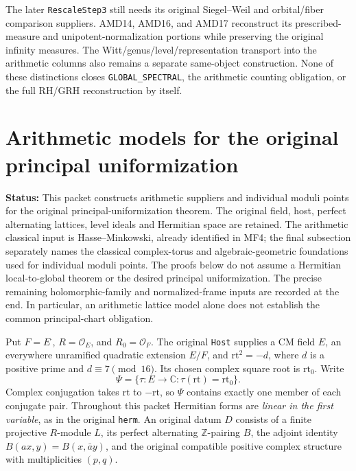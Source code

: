 \documentclass[11pt,a4paper]{article}
\numberwithin{equation}{section}
\theoremstyle{remark}\newtheorem{remark}[theorem]{Remark}
\newcommand{\status}[1]{\textbf{Status:} #1}
\begin{document}
The later \texttt{Rescale\allowbreak Step3} still needs its original
Siegel--Weil and orbital/fiber comparison suppliers.  AMD14,
AMD16, and AMD17 reconstruct its prescribed-measure and
unipotent-normalization portions while preserving the original
infinity measures.  The Witt/genus/level/representation
transport into the arithmetic columns also remains a separate
same-object construction.  None of these distinctions closes
\texttt{GLOBAL\_\allowbreak SPECTRAL}, the arithmetic counting obligation,
or the full RH/GRH reconstruction by itself.


\section{Arithmetic models for the original principal uniformization}
\label{sec:principal-uniformization-v48}

\status{This packet constructs arithmetic suppliers and individual
moduli points for the original principal-uniformization theorem.
The original field, host,
perfect alternating lattices, level ideals and Hermitian space are
retained.  The arithmetic classical input is Hasse--Minkowski,
already identified in MF4; the final subsection separately names
the classical complex-torus and algebraic-geometric foundations
used for individual moduli points.  The proofs below do not assume a Hermitian
local-to-global theorem or the desired principal uniformization.
The precise remaining holomorphic-family and normalized-frame inputs
are recorded at the end.  In particular, an arithmetic lattice model
alone does not establish the common principal-chart obligation.}

Put \(F=E^{\bar{\ } }\), \(R=\mathcal O_E\), and
\(R_0=\mathcal O_F\).  The original \texttt{Host} supplies a CM field
\(E\), an everywhere unramified quadratic extension \(E/F\), and
\(\mathrm{rt}^2=-d\), where \(d\) is a positive prime and
\(d\equiv7\pmod {16}\).  Its chosen complex square root is
\(\mathrm{rt}_0\).  Write
\[
 \Psi=\{\tau:E\longrightarrow\mathbb C:
                       \tau(\mathrm{rt})=\mathrm{rt}_0\}.
 \tag{PUN.1}
\]
Complex conjugation takes \(\mathrm{rt}\) to \(-\mathrm{rt}\), so
\(\Psi\) contains exactly one member of each conjugate pair.
Throughout this packet Hermitian forms are \emph{linear in the first
variable}, as in the original \texttt{herm}.  An original datum
\(D\) consists of a finite projective \(R\)-module \(L\), its perfect
alternating \(\mathbb Z\)-pairing \(B\), the adjoint identity
\(B(ax,y)=B(x,\bar a y)\), and the original compatible positive
complex structure with multiplicities \((p,q)\).
\end{document}
